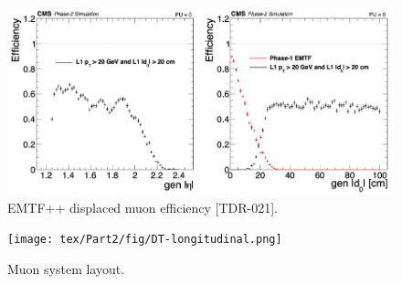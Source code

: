 \begin{figure}[hbtp]
\centering
\includegraphics[width=.97\linewidth]{tex/Part2/fig/EMTFpp_eff_vs_eta_d0.png}
\caption{
EMTF++ displaced muon efficiency [TDR-021].
}
\label{fig:Phase2TriggerProject}
\end{figure}

\begin{figure}[hbtp]
\centering
\texttt{[image: tex/Part2/fig/DT-longitudinal.png]}
\caption{
Muon system layout.
}
\label{fig:MuonSystem}
\end{figure}





